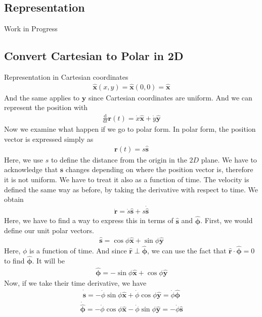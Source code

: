 \documentclass[12pt]{article}
\newcommand{\dydx}[2]{\frac{\text{d} #1}{\text{d} #2}}
\newcommand{\unx}{\hat{\mathbf{x}}}
\newcommand{\uny}{\hat{\mathbf{y}}}
\newcommand{\uns}{\hat{\mathbf{s}}}
\newcommand{\unr}{\hat{\mathbf{r}}}
\newcommand{\unphi}{\hat{\boldsymbol\phi}}
\begin{document}
\subsection{Representation}
Work in Progress

\subsection{Convert Cartesian to Polar in 2D}
Representation in Cartesian coordinates
\begin{align}
\unx(x,y)=\unx(0,0)=\unx
\end{align}
And the same applies to $\uny$ since Cartesian coordinates are uniform. And we can represent the position with
\begin{align}
\dydx{}{t}\mathbf{r}(t) = \Dot{x}\unx+\Dot{y}\uny
\end{align}
Now we examine what happen if we go to polar form. In polar form, the position vector is expressed simply as
\begin{align}
\mathbf{r}(t) = s\uns
\end{align}
Here, we use $s$ to define the distance from the origin in the $2D$ plane. We have to acknowledge that $\uns$ changes depending on where the position vector is, therefore it is not uniform. We have to treat it also as a function of time. The velocity is defined the same way as before, by taking the derivative with respect to time. We obtain 
\begin{align}
\Dot{\mathbf{r}} = \Dot{s}\uns + s\Dot{\uns} 
\end{align}
Here, we have to find a way to express this in terms of $\uns$ and $\unphi$. First, we would define our unit polar vectors.
\begin{align}
\uns = \cos\phi\unx + \sin\phi\uny
\end{align}
Here, $\phi$ is a function of time. And since $\unr \perp \unphi$, we can use the fact that $\unr \cdot \unphi = 0$ to find $\unphi$. It will be
\begin{align}
\unphi = -\sin\phi\unx + \cos\phi\uny
\end{align}
Now, if we take their time derivative, we have
\begin{align}
\Dot{\uns} = -\Dot{\phi}\sin\phi\unx + \Dot{\phi}\cos\phi\uny = \Dot{\phi}\unphi
\end{align}
\begin{align}
\Dot{\unphi} = -\Dot{\phi}\cos\phi\unx - \Dot{\phi}\sin\phi\uny = - \Dot{\phi}\uns
\end{align}
\end{document}
